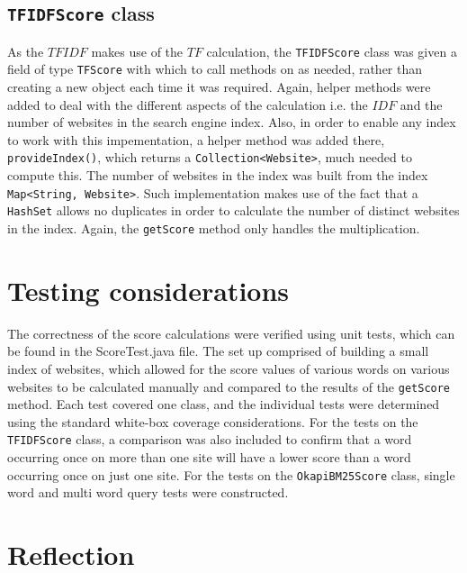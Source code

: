 \subsection{{\tt TFIDFScore} class}
As the $TFIDF$ makes use of the $TF$ calculation, the {\tt TFIDFScore} class was given a field of type {\tt TFScore} with which to call methods on as needed, rather than creating a new object each time it was required. Again, helper methods were added to deal with the different aspects of the calculation i.e. the $IDF$ and the number of websites in the search engine index. Also, in order to enable any index to work with this impementation, a helper method was added there, {\tt provideIndex()}, which returns a {\tt Collection<Website>}, much needed to compute this. The number of websites in the index was built from the index {\tt Map<String, Website>}. Such implementation makes use of the fact that a {\tt HashSet} allows no duplicates in order to calculate the number of distinct websites in the index.
Again, the {\tt getScore} method only handles the multiplication.

\section{Testing considerations}
The correctness of the score calculations were verified using unit tests, which can be found in the ScoreTest.java file.
The set up comprised of building a small index of websites, which allowed for the score values of various words on various
websites to be calculated manually and compared to the results of the {\tt getScore} method.
Each test covered one class, and the individual tests were determined using the standard white-box coverage considerations.
For the tests on the {\tt TFIDFScore} class, a comparison was also included to confirm that a word occurring once on more than one site will have a lower score than a word occurring once on just one site.
For the tests on the {\tt OkapiBM25Score} class, single word and multi word query tests were constructed.

\section{Reflection}

